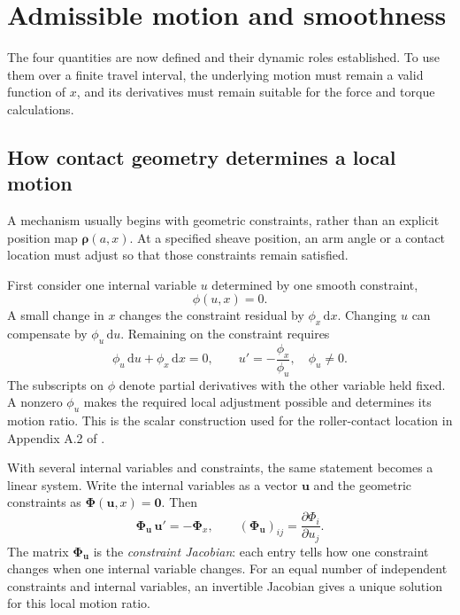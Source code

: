 \documentclass[11pt,letterpaper]{article}
\numberwithin{equation}{section}
\newcommand{\dd}{\mathrm{d}}
\newcommand{\rhoo}{\bm\rho}
\newcommand{\source}{\cite{formulation}}
\begin{document}
\section{Admissible motion and smoothness}
\label{sec:admissibility}

The four quantities are now defined and their dynamic roles established. To use them over a finite travel interval, the underlying motion must remain a valid function of $x$, and its derivatives must remain suitable for the force and torque calculations.

\subsection{How contact geometry determines a local motion}
\label{sec:geometry}

A mechanism usually begins with geometric constraints, rather than an explicit position map $\rhoo(a,x)$. At a specified sheave position, an arm angle or a contact location must adjust so that those constraints remain satisfied.

First consider one internal variable $u$ determined by one smooth constraint,
\begin{equation}
  \phi(u,x)=0.
\end{equation}
A small change in $x$ changes the constraint residual by $\phi_x\,\dd x$. Changing $u$ can compensate by $\phi_u\,\dd u$. Remaining on the constraint requires
\begin{equation}
  \phi_u\,\dd u+\phi_x\,\dd x=0,
  \qquad
  u'=-\frac{\phi_x}{\phi_u},
  \quad \phi_u\ne0.
  \label{eq:scalar-implicit}
\end{equation}
The subscripts on $\phi$ denote partial derivatives with the other variable held fixed. A nonzero $\phi_u$ makes the required local adjustment possible and determines its motion ratio. This is the scalar construction used for the roller-contact location in Appendix A.2 of \source.

With several internal variables and constraints, the same statement becomes a linear system. Write the internal variables as a vector $\bm u$ and the geometric constraints as $\bm\Phi(\bm u,x)=\bm0$. Then
\begin{equation}
  \bm\Phi_{\bm u}\,\bm u'=-\bm\Phi_x,
  \qquad
  (\bm\Phi_{\bm u})_{ij}=\frac{\partial\Phi_i}{\partial u_j}.
  \label{eq:implicit-first}
\end{equation}
The matrix $\bm\Phi_{\bm u}$ is the \emph{constraint Jacobian}: each entry tells how one constraint changes when one internal variable changes. For an equal number of independent constraints and internal variables, an invertible Jacobian gives a unique solution for this local motion ratio.
\end{document}
